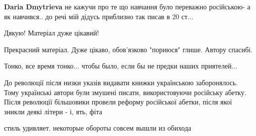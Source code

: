 \begin{itemize}
\begin{itemize}
\begin{itemize}
\textbf{Daria Dmytrieva} не кажучи про те що навчання було переважно
російською- а як навчився.. до речі мій дідусь приблизно так писав в 20 ст...
\end{itemize}

\end{itemize}

 
Дякую! Матеріал дуже цікавий!


 
Прекрасний матеріал. Дуже цікаво, обов'язково "пориюся" глише.
Автору спасибі.


 
Тонко, все время тонко... чтобы было, если бы не предки наших приятелей...

 

До революції після низки указів видавати книжки українською заборонялось. Тому
українські автори були змушені писати, використовуючи російську абетку. Після
революції більшовики провели реформу російської абетки, після якої зникли деякі
літери - і, ять, фіта

\begin{itemize}
 
стиль удивляет. некоторые обороты совсем вышли из обихода



\end{itemize}
\end{itemize}
